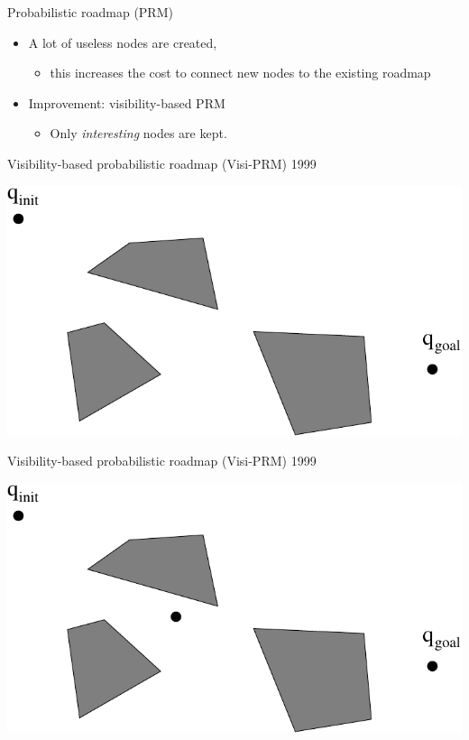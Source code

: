 \begin{frame} {Probabilistic roadmap (PRM)}
  \begin{itemize}
  \item A lot of useless nodes are created,
    \begin{itemize}
    \item this increases the cost to connect new nodes to the existing roadmap
    \end{itemize}
  \item Improvement: visibility-based PRM
    \begin{itemize}
    \item Only \textit{interesting} nodes are kept.
    \end{itemize}
  \end{itemize}
\end{frame}


%
%
\begin{frame} {Visibility-based probabilistic roadmap (Visi-PRM) 1999}
\centerline {
  \includegraphics[width=.8\linewidth]{figures/VPRM1.pdf}
}
\end{frame}

\begin{frame} {Visibility-based probabilistic roadmap (Visi-PRM) 1999}
\centerline {
  \includegraphics[width=.8\linewidth]{figures/VPRM2.pdf}
}
\end{frame}

